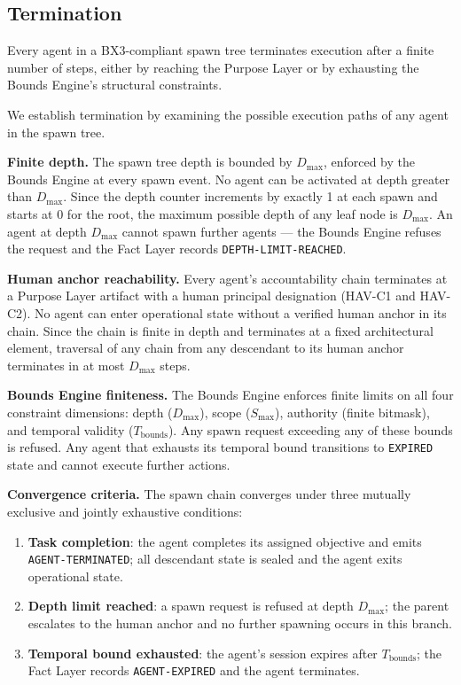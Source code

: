 \subsection{Termination}

\begin{property}[Termination] \label{prop:termination}
Every agent in a BX3-compliant spawn tree terminates execution after a finite number of steps, either by reaching the Purpose Layer or by exhausting the Bounds Engine's structural constraints.
\end{property}

\begin{Proof}
We establish termination by examining the possible execution paths of any agent in the spawn tree.

\medskip
\noindent\textbf{Finite depth.} The spawn tree depth is bounded by $D_{\max}$, enforced by the Bounds Engine at every spawn event. No agent can be activated at depth greater than $D_{\max}$. Since the depth counter increments by exactly 1 at each spawn and starts at 0 for the root, the maximum possible depth of any leaf node is $D_{\max}$. An agent at depth $D_{\max}$ cannot spawn further agents --- the Bounds Engine refuses the request and the Fact Layer records \texttt{DEPTH-LIMIT-REACHED}.

\medskip
\noindent\textbf{Human anchor reachability.} Every agent's accountability chain terminates at a Purpose Layer artifact with a human principal designation (HAV-C1 and HAV-C2). No agent can enter operational state without a verified human anchor in its chain. Since the chain is finite in depth and terminates at a fixed architectural element, traversal of any chain from any descendant to its human anchor terminates in at most $D_{\max}$ steps.

\medskip
\noindent\textbf{Bounds Engine finiteness.} The Bounds Engine enforces finite limits on all four constraint dimensions: depth ($D_{\max}$), scope ($S_{\max}$), authority (finite bitmask), and temporal validity ($T_{\text{bounds}}$). Any spawn request exceeding any of these bounds is refused. Any agent that exhausts its temporal bound transitions to \texttt{EXPIRED} state and cannot execute further actions.

\medskip
\noindent\textbf{Convergence criteria.} The spawn chain converges under three mutually exclusive and jointly exhaustive conditions:

\begin{enumerate}
  \item[(CC-1)] \textbf{Task completion}: the agent completes its assigned objective and emits \texttt{AGENT-TERMINATED}; all descendant state is sealed and the agent exits operational state.
  \item[(CC-2)] \textbf{Depth limit reached}: a spawn request is refused at depth $D_{\max}$; the parent escalates to the human anchor and no further spawning occurs in this branch.
  \item[(CC-3)] \textbf{Temporal bound exhausted}: the agent's session expires after $T_{\text{bounds}}$; the Fact Layer records \texttt{AGENT-EXPIRED} and the agent terminates.
\end{enumerate}


\end{Proof}
